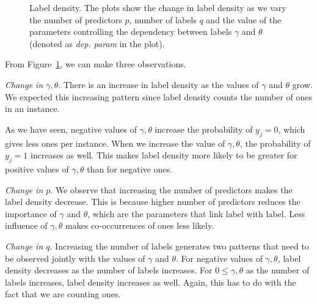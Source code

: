 \documentclass[review]{elsarticle}
\begin{document}
		\begin{figure}[H]
			\begin{center}
			\end{center}
			\caption{Label density. The plots show the change in label density as we vary the number of predictors $p$, number of labels $q$ and the value of the parameters controlling the dependency between labels $\gamma$ and $\theta$ (denoted as \emph{dep. param} in the plot).}
			\label{fig:results:density}
		\end{figure}
		
		From Figure~\ref{fig:results:density}, we can make three observations.
		
		\emph{Change in $\gamma,\theta$}. There is an increase in label density as the values of $\gamma$ and $\theta$ grow. We expected this increasing pattern since label density counts the number of ones in an instance. 
		
		As we have seen, negative values of $\gamma, \theta$ increase the probability of $y_{j}=0$, which gives less ones per instance. When we increase the value of $\gamma, \theta$, the probability of $y_{j}=1$ increases as well. This makes label density more likely to be greater for positive values of $\gamma, \theta$ than for negative ones.
		
		\emph{Change in $p$}. We observe that increasing the number of predictors makes the label density decrease. This is because higher number of predictors reduces the importance of $\gamma$ and $\theta$, which are the parameters that link label with label. Less influence of $\gamma, \theta$ makes co-occurrences of ones less likely. 
		
		\emph{Change in $q$}. Increasing the number of labels generates two patterns that need to be observed jointly with the values of $\gamma$ and $\theta$. For negative values of $\gamma, \theta$, label density decreases as the number of labels increases. For $0 \leq \gamma, \theta$ as the number of labels increases, label density increases as well. Again, this has to do with the fact that we are counting ones.
		
\end{document}
